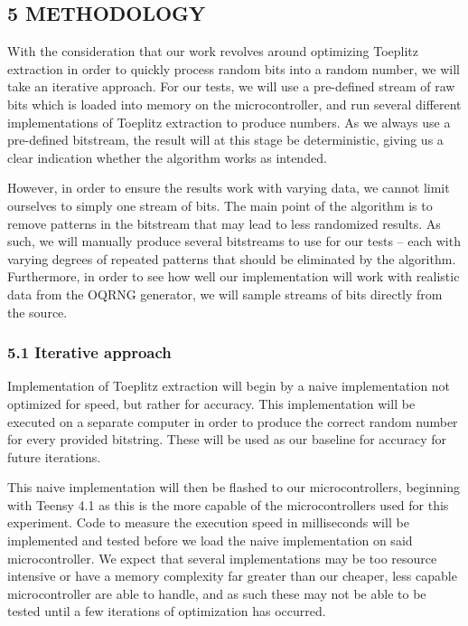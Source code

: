 \documentclass{sigchi}
\begin{document}
\subsection{5 METHODOLOGY}\label{methodology}

With the consideration that our work revolves around optimizing Toeplitz extraction in order to quickly process random bits into a random number, we will take an iterative approach. For our tests, we will use a pre-defined stream of raw bits which is loaded into memory on the microcontroller, and run several different implementations of Toeplitz extraction to produce numbers. As we always use a pre-defined bitstream, the result will at this stage be deterministic, giving us a clear indication whether the algorithm works as intended.

However, in order to ensure the results work with varying data, we cannot limit ourselves to simply one stream of bits. The main point of the algorithm is to remove patterns in the bitstream that may lead to less randomized results. As such, we will manually produce several bitstreams to use for our tests -- each with varying degrees of repeated patterns that should be eliminated by the algorithm. Furthermore, in order to see how well our implementation will work with realistic data from the OQRNG generator, we will sample streams of bits directly from the source.

\subsubsection{5.1 Iterative approach}\label{iterative-approach}

Implementation of Toeplitz extraction will begin by a naive implementation not optimized for speed, but rather for accuracy. This implementation will be executed on a separate computer in order to produce the correct random number for every provided bitstring. These will be used as our baseline for accuracy for future iterations.

This naive implementation will then be flashed to our microcontrollers, beginning with Teensy 4.1 as this is the more capable of the microcontrollers used for this experiment. Code to measure the execution speed in milliseconds will be implemented and tested before we load the naive implementation on said microcontroller. We expect that several implementations may be too resource intensive or have a memory complexity far greater than our cheaper, less capable microcontroller are able to handle, and as such these may not be able to be tested until a few iterations of optimization has occurred.
\end{document}

